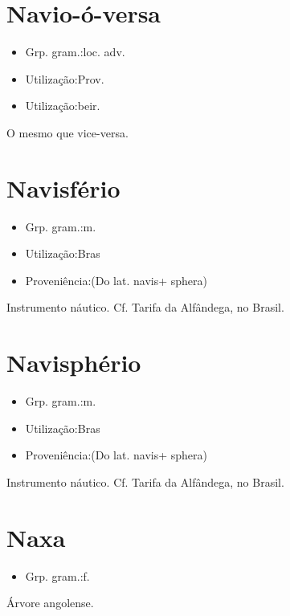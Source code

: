 \section{Navio-ó-versa}
\begin{itemize}
\item {Grp. gram.:loc. adv.}
\end{itemize}
\begin{itemize}
\item {Utilização:Prov.}
\end{itemize}
\begin{itemize}
\item {Utilização:beir.}
\end{itemize}
O mesmo que \textunderscore vice-versa\textunderscore .
\section{Navisfério}
\begin{itemize}
\item {Grp. gram.:m.}
\end{itemize}
\begin{itemize}
\item {Utilização:Bras}
\end{itemize}
\begin{itemize}
\item {Proveniência:(Do lat. \textunderscore navis\textunderscore  + \textunderscore sphera\textunderscore )}
\end{itemize}
Instrumento náutico. Cf. \textunderscore Tarifa da Alfândega\textunderscore , no Brasil.
\section{Navisphério}
\begin{itemize}
\item {Grp. gram.:m.}
\end{itemize}
\begin{itemize}
\item {Utilização:Bras}
\end{itemize}
\begin{itemize}
\item {Proveniência:(Do lat. \textunderscore navis\textunderscore  + \textunderscore sphera\textunderscore )}
\end{itemize}
Instrumento náutico. Cf. \textunderscore Tarifa da Alfândega\textunderscore , no Brasil.
\section{Naxa}
\begin{itemize}
\item {Grp. gram.:f.}
\end{itemize}
Árvore angolense.
